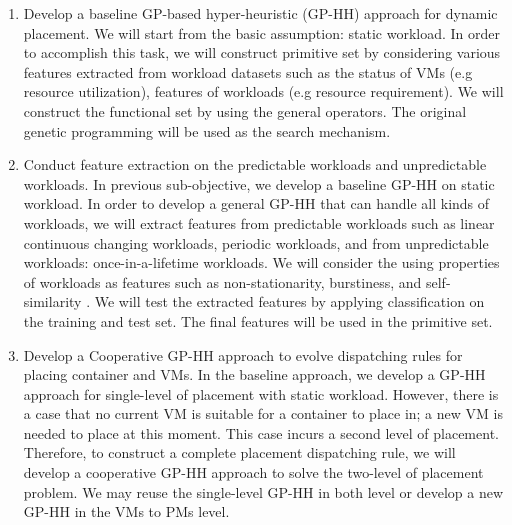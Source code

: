 \begin{enumerate}

	\item Develop a baseline GP-based hyper-heuristic (GP-HH) approach for dynamic placement. 
	 We will start from the basic assumption: static workload. In order to accomplish this task, we will construct primitive set by considering various features extracted from workload datasets such as the status of VMs (e.g resource utilization), features of workloads (e.g resource requirement). We will construct the functional set by using the general operators. The original genetic programming will be used as the search mechanism.

	\item Conduct feature extraction on the predictable workloads and unpredictable workloads.
	 In previous sub-objective, we develop a baseline GP-HH on static workload. In order to develop a general GP-HH that can handle all kinds of workloads, we will extract features from predictable workloads such as linear continuous changing workloads, periodic workloads, and from unpredictable workloads: once-in-a-lifetime workloads. We will consider the using properties of workloads as features such as non-stationarity, burstiness, and self-similarity \cite{Feitelson:2002kn}. We will test the extracted features by applying classification on the training and test set. The final features will be used in the primitive set.



	\item Develop a Cooperative GP-HH approach to evolve dispatching rules for placing container and VMs.
	 In the baseline approach, we develop a GP-HH approach for single-level of placement with static workload. However, there is a case that no current VM is suitable for a container to place in; a new VM is needed to place at this moment. This case incurs a second level of placement. Therefore, to construct a complete placement dispatching rule, we will develop a cooperative GP-HH approach to solve the two-level of placement problem. We may reuse the single-level GP-HH in both level or develop a new GP-HH in the VMs to PMs level.  


\end{enumerate}
